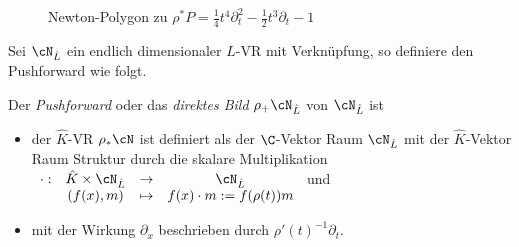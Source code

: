 \begin{exmp}
\begin{figure}[htbp]
  \begin{minipage}[hbt]{0,49\textwidth}
  \begin{center}
  \end{center}
  \caption[Newton-Polygon zu $\rho^*P=%
    \frac{1}{4}t^4\partial_t^2-\frac{1}{2}t^3\partial_t-1$]
    {Newton-Polygon zu \newline $\rho^*P=%
    \frac{1}{4}t^4\partial_t^2-\frac{1}{2}t^3\partial_t-1$}
  \label{fig:Pull-Back2}
  \end{minipage}
\end{figure}
\end{exmp}

Sei $\cN_{\hat L}$ ein endlich dimensionaler $\hat L$-VR mit Verknüpfung, so
definiere den Pushforward wie folgt.
\begin{comment}
TODO: korregieren, besser formulieren
\end{comment}
\begin{defn}[Pushforward]
Der \emph{Pushforward} oder das \emph{direktes Bild} $\rho_+\cN_{\hat L}$ von
$\cN_{\hat L}$ ist
\begin{itemize}
\item der $\hat K$-VR $\rho_*\cN$ ist definiert als der $\C$-Vektor Raum
$\cN_{\hat L}$ mit der $\hat K$-Vektor Raum Struktur durch
die skalare Multiplikation
$\begin{array}[t]{cccc}
\cdot: & \hat{K}\times\cN_{\hat{L}} & \rightarrow & \cN_{\hat{L}}\\
 & (f(x),m) & \mapsto & f(x)\cdot m:=f(\rho(t))m
\end{array}$ und
\item mit der Wirkung $\partial_x$ beschrieben durch
$\rho'(t)^{-1}\partial_t$.
\end{itemize}
\end{defn}

